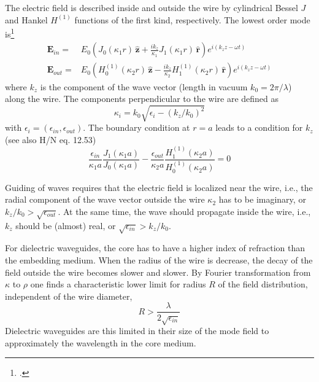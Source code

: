 The electric field is described inside and outside the wire by cylindrical Bessel $J$ and Hankel $H^{(1)}$ functions of the first kind, respectively. The lowest order mode is\footcite{Takahara}
\begin{align*}
  \mathbf{E}_{in} = & E_0 \left( J_0 (\kappa_1 r)\,  \mathbf{\hat{z}} + \frac{i k_z}{\kappa_1} J_1 (\kappa_1 r)  \, \mathbf{\hat{r}} \right) e^{i (k_z z - \omega t)} \\
  \mathbf{E}_{out} =& E_0 \left( H_0^{(1)} (\kappa_2 r) \,  \mathbf{\hat{z}} - \frac{i k_z}{\kappa_2} H_1^{(1)} (\kappa_2 r)  \, \mathbf{\hat{r}} \right) e^{i (k_z z - \omega t)}
\end{align*}
where $k_z$ is the component of the wave vector (length in vacuum $k_0 = 2 \pi / \lambda$) along the wire. The components  perpendicular to the wire are defined as
\begin{equation}
  \kappa_i = k_0 \sqrt{\epsilon_i - (k_z / k_0)^2}
\end{equation}
with $\epsilon_i = (\epsilon_{in}, \epsilon_{out})$.
The boundary condition at $r=a$ leads to a condition for $k_z$ (see also H/N eq. 12.53)
\begin{equation}
  \frac{\epsilon_{in}}{\kappa_1 a} \frac{J_1(\kappa_1 a)}{J_0(\kappa_1 a)}
 -  \frac{\epsilon_{out}}{\kappa_2 a} \frac{H_1^{(1)}(\kappa_2 a)}{H_0^{(1)}(\kappa_2 a)}
 = 0
\end{equation}

Guiding of waves requires that the electric field is localized near the wire, i.e., the radial component of the wave vector outside the wire $\kappa_2$ has to be imaginary, or $k_z / k_0 > \sqrt{\epsilon_{out}}$. At the same time, the wave should propagate inside the wire, i.e., $k_z$ should be (almost) real, or $\sqrt{\epsilon_{in}} > k_z / k_0$. 

For dielectric waveguides, the core has to have a higher index of refraction than the embedding medium. When the radius of the wire is decrease, the decay of the field outside the wire becomes slower and slower.  By Fourier transformation from $\kappa$ to $\rho$ one finds a characteristic lower limit for radius $R$ of the field distribution, independent of the wire diameter,
\begin{equation}
  R > \frac{\lambda}{2 \sqrt{\epsilon_{in}}}
\end{equation}
Dielectric waveguides are this limited in their size of the mode field to approximately the wavelength in the core medium.

